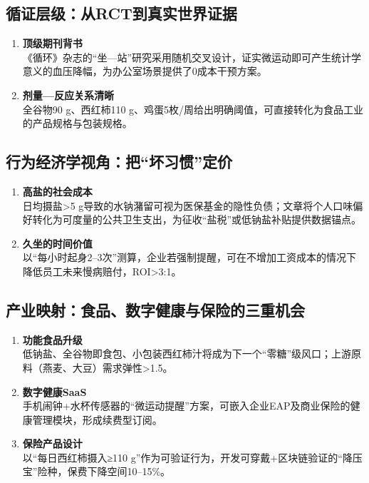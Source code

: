 \subsection{循证层级：从RCT到真实世界证据}
\begin{enumerate}[leftmargin=*, nosep]
    \item \textbf{顶级期刊背书}  \\
    《循环》杂志的“坐—站”研究采用随机交叉设计，证实微运动即可产生统计学意义的血压降幅，为办公室场景提供了0成本干预方案。
    \item \textbf{剂量—反应关系清晰}  \\
    全谷物90 g、西红柿110 g、鸡蛋5枚/周给出明确阈值，可直接转化为食品工业的产品规格与包装规格。
\end{enumerate}

\subsection{行为经济学视角：把“坏习惯”定价}
\begin{enumerate}[leftmargin=*, nosep]
    \item \textbf{高盐的社会成本}  \\
    日均摄盐>5 g导致的水钠潴留可视为医保基金的隐性负债；文章将个人口味偏好转化为可度量的公共卫生支出，为征收“盐税”或低钠盐补贴提供数据锚点。
    \item \textbf{久坐的时间价值}  \\
    以“每小时起身2–3次”测算，企业若强制提醒，可在不增加工资成本的情况下降低员工未来慢病赔付，ROI>3:1。
\end{enumerate}

\subsection{产业映射：食品、数字健康与保险的三重机会}
\begin{enumerate}[leftmargin=*, nosep]
    \item \textbf{功能食品升级}  \\
    低钠盐、全谷物即食包、小包装西红柿汁将成为下一个“零糖”级风口；上游原料（燕麦、大豆）需求弹性>1.5。
    \item \textbf{数字健康SaaS}  \\
    手机闹钟+水杯传感器的“微运动提醒”方案，可嵌入企业EAP及商业保险的健康管理模块，形成续费型订阅。
    \item \textbf{保险产品设计}  \\
    以“每日西红柿摄入≥110 g”作为可验证行为，开发可穿戴+区块链验证的“降压宝”险种，保费下降空间10–15\%。
\end{enumerate}

